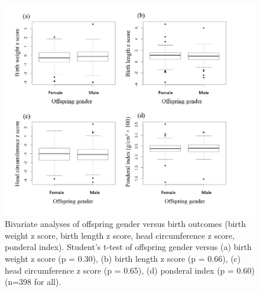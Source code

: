 \begin{figure}
  \centering
    \label{fig:Fig330}
  \includegraphics[scale=1]{Figures/Fig330.pdf}
  \caption[Bivariate analyses of offspring gender versus birth outcomes (birth weight z score, birth length z score, head circumference z score, ponderal index)]{Bivariate analyses of offspring gender versus birth outcomes (birth weight z score, birth length z score, head circumference z score, ponderal index). Student's t-test of offspring gender versus (a) birth weight z score (p = 0.30), (b) birth length z score (p = 0.66), (c) head circumference z score (p = 0.65), (d) ponderal index (p = 0.60) (n=398 for all).}
\end{figure}

